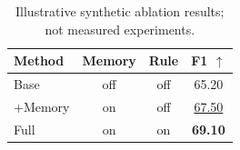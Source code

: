 \begin{table}[t]
\centering
\caption{Illustrative synthetic ablation results; not measured experiments.}
\label{tab:ablation}
\begin{tabular}{@{}lccc@{}}
\toprule
Method & Memory & Rule & F1 $\uparrow$ \\
\midrule
Base & off & off & 65.20 \\
+Memory & on & off & \underline{67.50} \\
Full & on & on & \textbf{69.10} \\
\bottomrule
\end{tabular}
\end{table}
